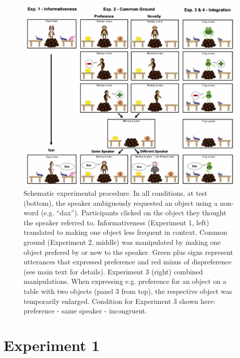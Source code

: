 \documentclass[10pt, letterpaper]{article}
\newenvironment{CodeChunk}{}{}
\begin{document}
\begin{CodeChunk}
\begin{figure}[h]

{\centering \includegraphics{figs/design-1} 

}

\caption[Schematic experimental procedure]{Schematic experimental procedure. In all conditions, at test (bottom), the speaker ambiguously requested an object using a non-word (e.g. “dax”). Participants clicked on the object they thought the speaker referred to. Informativeness (Experiment 1, left) translated to making one object less frequent in context. Common ground (Experiment 2, middle) was manipulated by making one object prefered by or new to the speaker. Green plus signs represent utterances that expressed preference and red minus of dispreference (see main text for details). Experiment 3 (right) combined manipulations. When expressing e.g. preference for an object on a table with two objects (panel 3 from top), the respective object was temporarily enlarged. Condition for Experiment 3 shown here: preference - same speaker - incongruent.}\label{fig:design}
\end{figure}
\end{CodeChunk}

\section{Experiment 1}\label{experiment-1}
\end{document}
